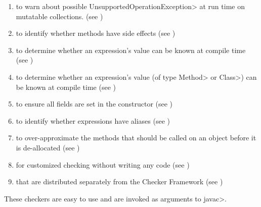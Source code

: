 \begin{enumerate}
   to
  ensure unsigned and signed values are not mixed
  (see )
\item
   to
  warn about possible \<UnsupportedOperationException> at run time on mutatable collections.
  (see )
\item
   to identify whether
  methods have side effects (see )
\item
   to determine
  whether an expression's value can be known at compile time
  (see )
\item
   to determine
  whether an expression's value (of type \<Method> or \<Class>) can be known at compile time
  (see )
\item
   to ensure all
  fields are set in the constructor (see
  )
\item
   to identify whether
  expressions have aliases (see )
\item
   to over-approximate the
  methods that should be called on an object before it is de-allocated (see )
\item
   for customized checking without
  writing any code (see )
\item
   that are distributed
  separately from the Checker Framework
  (see )

\end{enumerate}

\noindent
These checkers are easy to use and are invoked as arguments to \<javac>.



